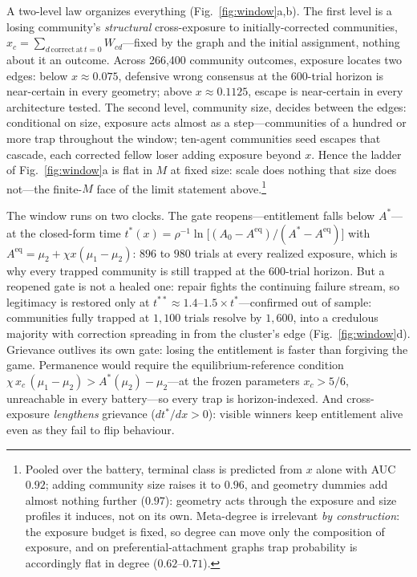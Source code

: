 \documentclass[11pt]{article}
\newcommand{\1}{\mathbf{1}}
\newcommand{\Astar}{A^{*}}
\begin{document}
A two-level law organizes everything (Fig.~\ref{fig:window}a,b). The first level is a losing community's \emph{structural} cross-exposure to initially-corrected communities, $x_c=\sum_{d\,\mathrm{correct\,at}\,t=0}W_{cd}$---fixed by the graph and the initial assignment, nothing about it an outcome. Across 266,400 community outcomes, exposure locates two edges: below $x\approx0.075$, defensive wrong consensus at the 600-trial horizon is near-certain in every geometry; above $x\approx0.1125$, escape is near-certain in every architecture tested. The second level, community size, decides between the edges: conditional on size, exposure acts almost as a step---communities of a hundred or more trap throughout the window; ten-agent communities seed escapes that cascade, each corrected fellow loser adding exposure beyond $x$. Hence the ladder of Fig.~\ref{fig:window}a is flat in $M$ at fixed size: scale does nothing that size does not---the finite-$M$ face of the limit statement above.\footnote{Pooled over the battery, terminal class is predicted from $x$ alone with AUC $0.92$; adding community size raises it to $0.96$, and geometry dummies add almost nothing further ($0.97$): geometry acts through the exposure and size profiles it induces, not on its own. Meta-degree is irrelevant \emph{by construction}: the exposure budget is fixed, so degree can move only the composition of exposure, and on preferential-attachment graphs trap probability is accordingly flat in degree ($0.62$--$0.71$).}

The window runs on two clocks. The gate reopens---entitlement falls below $\Astar$---at the closed-form time $t^{*}(x)=\rho^{-1}\ln\!\bigl[(A_0-A^{\mathrm{eq}})/(\Astar-A^{\mathrm{eq}})\bigr]$ with $A^{\mathrm{eq}}=\mu_2+\chi x(\mu_1-\mu_2)$: $896$ to $980$ trials at every realized exposure, which is why every trapped community is still trapped at the 600-trial horizon. But a reopened gate is not a healed one: repair fights the continuing failure stream, so legitimacy is restored only at $t^{**}\approx1.4$--$1.5\times t^{*}$---confirmed out of sample: communities fully trapped at $1{,}100$ trials resolve by $1{,}600$, into a credulous majority with correction spreading in from the cluster's edge (Fig.~\ref{fig:window}d). Grievance outlives its own gate: losing the entitlement is faster than forgiving the game. Permanence would require the equilibrium-reference condition $\chi\,x_c\,(\mu_1-\mu_2)>\Astar(\mu_2)-\mu_2$---at the frozen parameters $x_c>5/6$, unreachable in every battery---so every trap is horizon-indexed. And cross-exposure \emph{lengthens} grievance ($dt^{*}/dx>0$): visible winners keep entitlement alive even as they fail to flip behaviour.
\end{document}
